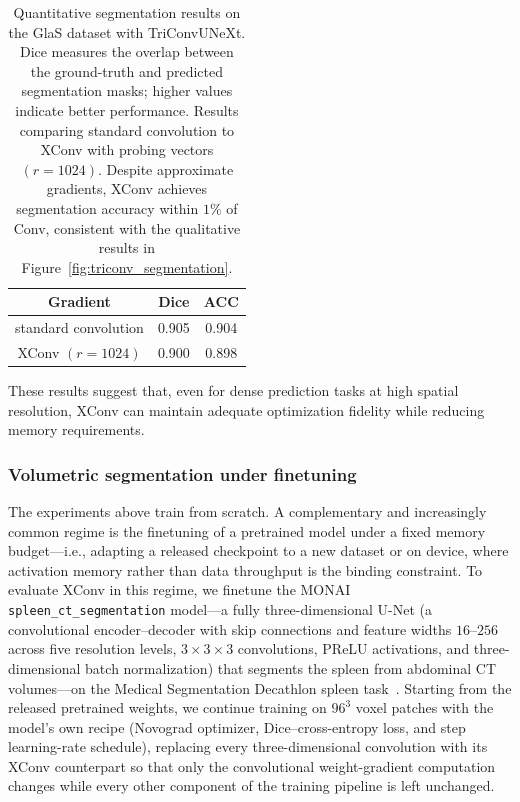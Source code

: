 \documentclass[10pt]{article}
\begin{document}
\begin{table}[t]
    \centering
    \begin{tabular}{ccc}
    \toprule
    \textbf{Gradient} & \textbf{Dice} & \textbf{ACC} \\
    \midrule
     standard convolution &  0.905 & 0.904\\
     XConv $(r{=}1024)$ &  0.900 & 0.898 \\
    \bottomrule
    \end{tabular}
    \caption{Quantitative segmentation results on the GlaS dataset with TriConvUNeXt. Dice measures the overlap between the ground-truth and predicted segmentation masks; higher values indicate better performance. Results comparing standard convolution to XConv with probing vectors $(r=1024)$. Despite approximate gradients, XConv achieves segmentation accuracy within $1\%$ of Conv, consistent with the qualitative results in Figure~\ref{fig:triconv_segmentation}.}
    \label{tab:triconv_dice_results}
\end{table}

These results suggest that, even for dense prediction tasks at high spatial resolution, XConv can maintain adequate optimization fidelity while reducing memory requirements.

\subsubsection{Volumetric segmentation under finetuning}
\label{subsubsec:finetune_3dseg}

The experiments above train from scratch. A complementary and increasingly common regime is the finetuning of a pretrained model under a fixed memory budget---i.e., adapting a released checkpoint to a new dataset or on device, where activation memory rather than data throughput is the binding constraint. To evaluate XConv in this regime, we finetune the MONAI~\citep{cardoso2022monai} \texttt{spleen\_ct\_segmentation} model---a fully three-dimensional U-Net (a convolutional encoder--decoder with skip connections and feature widths $16$--$256$ across five resolution levels, $3\times3\times3$ convolutions, PReLU activations, and three-dimensional batch normalization) that segments the spleen from abdominal CT volumes---on the Medical Segmentation Decathlon spleen task~\citep{antonelli2022medical}.
Starting from the released pretrained weights, we continue training on $96^3$ voxel patches with the model's own recipe (Novograd optimizer, Dice--cross-entropy loss, and step learning-rate schedule), replacing every three-dimensional convolution with its XConv counterpart so that only the convolutional weight-gradient computation changes while every other component of the training pipeline is left unchanged.
\end{document}
